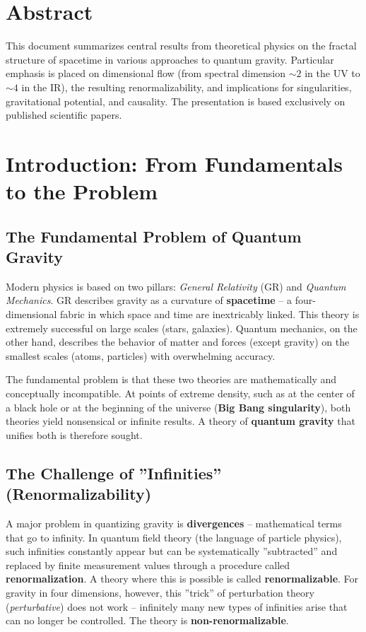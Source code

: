 \section*{Abstract}
		This document summarizes central results from theoretical physics on the fractal structure of spacetime in various approaches to quantum gravity. Particular emphasis is placed on dimensional flow (from spectral dimension $\sim 2$ in the UV to $\sim 4$ in the IR), the resulting renormalizability, and implications for singularities, gravitational potential, and causality. The presentation is based exclusively on published scientific papers.

	
	\section{Introduction: From Fundamentals to the Problem}
	\subsection{The Fundamental Problem of Quantum Gravity}
	Modern physics is based on two pillars: \emph{General Relativity} (GR) and \emph{Quantum Mechanics}. GR describes gravity as a curvature of \textbf{spacetime} – a four-dimensional fabric in which space and time are inextricably linked. This theory is extremely successful on large scales (stars, galaxies). Quantum mechanics, on the other hand, describes the behavior of matter and forces (except gravity) on the smallest scales (atoms, particles) with overwhelming accuracy.
	
	The fundamental problem is that these two theories are mathematically and conceptually incompatible. At points of extreme density, such as at the center of a black hole or at the beginning of the universe (\textbf{Big Bang singularity}), both theories yield nonsensical or infinite results. A theory of \textbf{quantum gravity} that unifies both is therefore sought.
	
	\subsection{The Challenge of ''Infinities'' (Renormalizability)}
	A major problem in quantizing gravity is \textbf{divergences} – mathematical terms that go to infinity. In quantum field theory (the language of particle physics), such infinities constantly appear but can be systematically ''subtracted'' and replaced by finite measurement values through a procedure called \textbf{renormalization}. A theory where this is possible is called \textbf{renormalizable}. For gravity in four dimensions, however, this ''trick'' of perturbation theory (\emph{perturbative}) does not work – infinitely many new types of infinities arise that can no longer be controlled. The theory is \textbf{non-renormalizable}.
	
